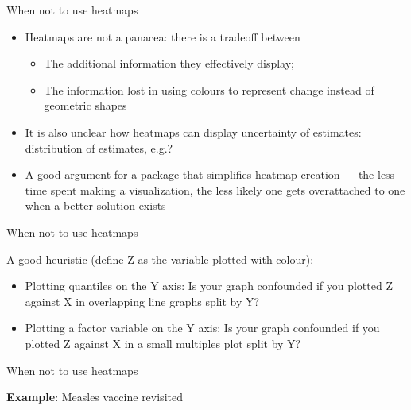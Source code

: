 

{
}

\begin{frame}{When not to use heatmaps}

\begin{itemize}
        \item Heatmaps are not a panacea: there is a tradeoff between
                \begin{itemize}
                        \item The additional information they effectively display;
                        \item The information lost in using colours to represent change instead of geometric shapes
                \end{itemize}
        \item It is also unclear how heatmaps can display uncertainty of estimates:
              distribution of estimates, e.g.?
        \item A good argument for a package that simplifies heatmap creation ---
              the less time spent making a visualization, the less likely
              one gets overattached to one when a better solution exists
\end{itemize}
\end{frame}

\begin{frame}{When not to use heatmaps}

A good heuristic (define Z as the variable plotted with colour):
                \begin{itemize}
                      \item Plotting quantiles on the Y axis:
                            Is your graph confounded if you plotted Z against X
                            in overlapping line graphs split by Y?
                        \item Plotting a factor variable on the Y axis:
                              Is your graph confounded if you plotted Z against X
                              in a small multiples plot split by Y?
                \end{itemize}
\end{frame}

\begin{frame}{When not to use heatmaps}

\textbf{Example}: Measles vaccine revisited


\end{frame}


